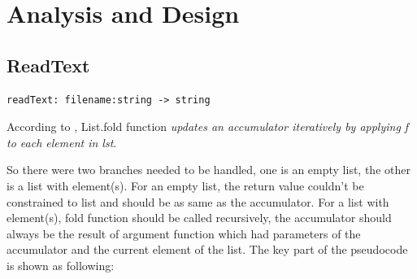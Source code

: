 \documentclass{article}
\begin{document}




\section{Analysis and Design}

\subsection{ReadText}
\begin{lstlisting}
readText: filename:string -> string
\end{lstlisting}

According to \cite{sporring2019}, List.fold function \emph{updates an accumulator iteratively by applying f to each element in lst}. 

So there were two branches needed to be handled, one is an empty list, the other is a list with element(s). For an empty list, the return value couldn't be constrained to list and should be as same as the accumulator. For a list with element(s), fold function should be called recursively, the accumulator should always be the result of argument function which had parameters of the accumulator and the current element of the list. The key part of the pseudocode is shown as following:
\end{document}
